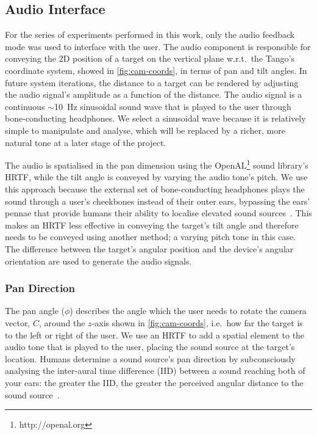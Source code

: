 \documentclass[sigconf, screen=true, anonymous=true]{acmart}
\begin{document}
\subsection{Audio Interface}

For the series of experiments performed in this work, only the audio feedback mode was used to interface with the user.
The audio component is responsible for conveying the 2D position of a target on the vertical plane w.r.t.\ the Tango's coordinate system, showed in \cref{fig:cam-coords}, in terms of pan and tilt angles.
In future system iterations, the distance to a target can be rendered by adjusting the audio signal's amplitude as a function of the distance.
The audio signal is a continuous $\sim$\SI{10}{\hertz} sinusoidal sound wave that is played to the user through bone-conducting headphones.
We select a sinusoidal wave because it is relatively simple to manipulate and analyse, which will be replaced by a richer, more natural tone at a later stage of the project. 

The audio is spatialised in the pan dimension using the OpenAL\footnote{http://openal.org} sound library's HRTF, while the tilt angle is conveyed by varying the audio tone's pitch.
We use this approach because the external set of bone-conducting headphones plays the sound through a user's cheekbones instead of their outer ears, bypassing the ears' pennae that provide humans their ability to localise elevated sound sources~\cite{roffler1968factors, algazi2001elevation}.
This makes an HRTF less effective in conveying the target's tilt angle and therefore needs to be conveyed using another method; a varying pitch tone in this case.
The difference between the target's angular position and the device's angular orientation are used to generate the audio signals. 

\subsubsection{Pan Direction}

The pan angle ($\phi$) describes the angle which the user needs to rotate the camera vector, $C$, around the $z$-axis shown in \cref{fig:cam-coords}, i.e.\ how far the target is to the left or right of the user.
We use an HRTF to add a spatial element to the audio tone that is played to the user, placing the sound source at the target's location. 
Humans determine a sound source's pan direction by subconsciously analysing the inter-aural time difference (IID) between a sound reaching both of your ears: the greater the IID, the greater the perceived angular distance to the sound source~\cite{wightman1992dominant}.
\end{document}

